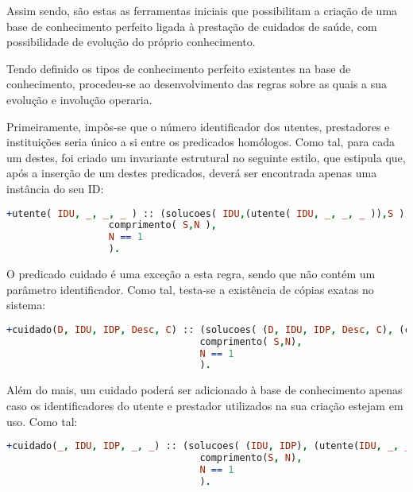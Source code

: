 \documentclass[a4paper]{article}
\begin{document}
Assim sendo, são estas as ferramentas iniciais que possibilitam a criação de uma base de conhecimento perfeito ligada à prestação de cuidados de saúde, com possibilidade de evolução do próprio conhecimento.


\par Tendo definido os tipos de conhecimento perfeito existentes na base de conhecimento, procedeu-se ao desenvolvimento das regras sobre as quais a sua evolução e involução operaria. 

\par Primeiramente, impôs-se que o número identificador dos utentes, prestadores e instituições seria único a si entre os predicados homólogos. Como tal, para cada um destes, foi criado um invariante estrutural no seguinte estilo, que estipula que, após a inserção de um destes predicados, deverá ser encontrada apenas uma instância do seu ID:

\begin{lstlisting}[language=Prolog, caption=Invariante estrutural : não permitir a inserção de utente com um ID que já está registado na base de conhecimento.]
+utente( IDU, _, _, _ ) :: (solucoes( IDU,(utente( IDU, _, _, _ )),S ),
                  comprimento( S,N ), 
                  N == 1
                  ).
\end{lstlisting}

\par O predicado cuidado é uma exceção a esta regra, sendo que não contém um parâmetro identificador. Como tal, testa-se a existência de cópias exatas no sistema:

\begin{lstlisting}[language=Prolog, caption=Invariante estrutural : não permitir a inserção de duplicados de cuidado.]
+cuidado(D, IDU, IDP, Desc, C) :: (solucoes( (D, IDU, IDP, Desc, C), (cuidado(D, IDU, IDP, Desc, C)), S),
                                  comprimento( S,N),
                                  N == 1
                                  ).
\end{lstlisting}

\par Além do mais, um cuidado poderá ser adicionado à base de conhecimento apenas caso os identificadores do utente e prestador utilizados na sua criação estejam em uso. Como tal:

\begin{lstlisting}[language=Prolog, caption=Invariante referencial : não permitir a inserção de cuidados se os intervenientes não existirem na base de conhecimento.]
+cuidado(_, IDU, IDP, _, _) :: (solucoes( (IDU, IDP), (utente(IDU, _, _, _), prestador(IDP, _, _, _)), S),
                                  comprimento(S, N),
                                  N == 1
                                  ).
\end{lstlisting}
\end{document}
